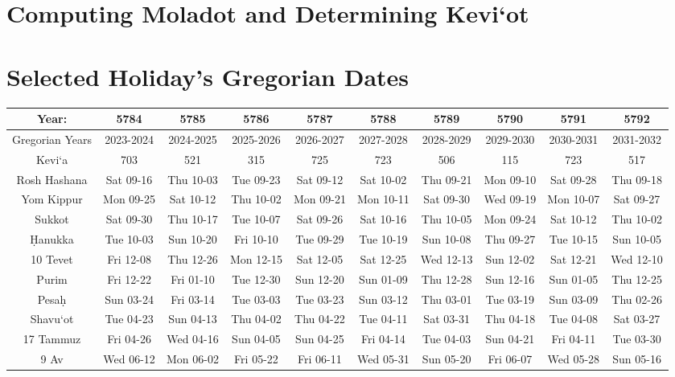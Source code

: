 \chapter{Computing Moladot and Determining Kevi`ot}



\chapter{Selected Holiday's Gregorian Dates}
\begin{footnotesize}
	\begin{tabular}{c | c | c | c | c | c | c | c | c | c}
		Year:&5784&5785&5786&5787&5788&5789&5790&5791&5792\\\hline
		Gregorian Years&2023-2024&2024-2025&2025-2026&2026-2027&2027-2028&2028-2029&2029-2030&2030-2031&2031-2032\\\hline
		Kevi`a&703&521&315&725&723&506&115&723&517\\\hline
		Rosh Hashana&Sat 09-16&Thu 10-03&Tue 09-23&Sat 09-12&Sat 10-02&Thu 09-21&Mon 09-10&Sat 09-28&Thu 09-18\\\hline
		Yom Kippur&Mon 09-25&Sat 10-12&Thu 10-02&Mon 09-21&Mon 10-11&Sat 09-30&Wed 09-19&Mon 10-07&Sat 09-27\\\hline
		Sukkot&Sat 09-30&Thu 10-17&Tue 10-07&Sat 09-26&Sat 10-16&Thu 10-05&Mon 09-24&Sat 10-12&Thu 10-02\\\hline
		\d{H}anukka&Tue 10-03&Sun 10-20&Fri 10-10&Tue 09-29&Tue 10-19&Sun 10-08&Thu 09-27&Tue 10-15&Sun 10-05\\\hline
		10 Tevet&Fri 12-08&Thu 12-26&Mon 12-15&Sat 12-05&Sat 12-25&Wed 12-13&Sun 12-02&Sat 12-21&Wed 12-10\\\hline
		Purim&Fri 12-22&Fri 01-10&Tue 12-30&Sun 12-20&Sun 01-09&Thu 12-28&Sun 12-16&Sun 01-05&Thu 12-25\\\hline
		Pesa\d{h}&Sun 03-24&Fri 03-14&Tue 03-03&Tue 03-23&Sun 03-12&Thu 03-01&Tue 03-19&Sun 03-09&Thu 02-26\\\hline
		Shavu`ot&Tue 04-23&Sun 04-13&Thu 04-02&Thu 04-22&Tue 04-11&Sat 03-31&Thu 04-18&Tue 04-08&Sat 03-27\\\hline
		17 Tammuz&Fri 04-26&Wed 04-16&Sun 04-05&Sun 04-25&Fri 04-14&Tue 04-03&Sun 04-21&Fri 04-11&Tue 03-30\\\hline
		9 Av&Wed 06-12&Mon 06-02&Fri 05-22&Fri 06-11&Wed 05-31&Sun 05-20&Fri 06-07&Wed 05-28&Sun 05-16\\\hline
\end{tabular}
\vspace{1.5\baselineskip}

\end{footnotesize}
